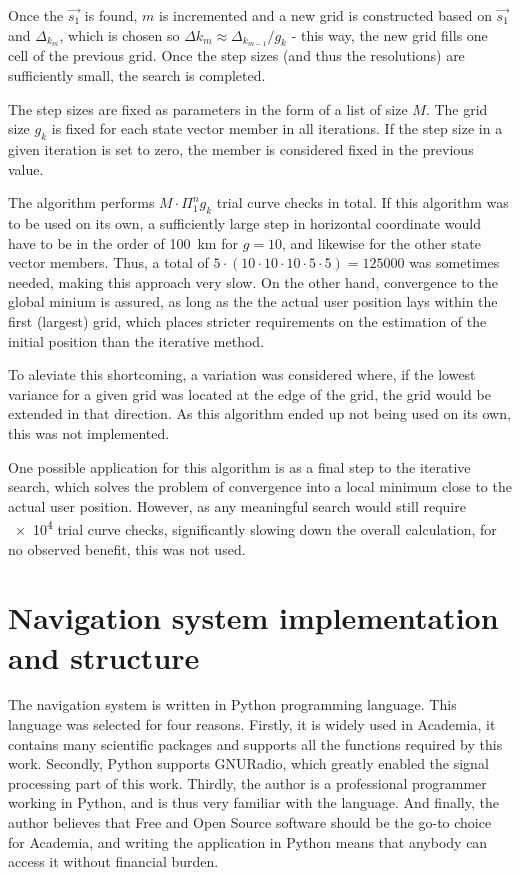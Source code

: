 Once the $\Vec{s_1}$ is found, $m$ is incremented and a new grid is constructed based on $\Vec{s_1}$ and $\Delta_{k_m}$, which is chosen so $\Delta{k_{m}} \approx \Delta_{k_{m-1}} / g_k$ - this way, the new grid fills one cell of the previous grid. Once the step sizes (and thus the resolutions) are sufficiently small, the search is completed.

The step sizes are fixed as parameters in the form of a list of size $M$. The grid size $g_k$ is fixed for each state vector member in all iterations. If the step size in a given iteration is set to zero, the member is considered fixed in the previous value.

The algorithm performs $M \cdot \Pi^n_1 g_k$ trial curve checks in total. If this algorithm was to be used on its own, a sufficiently large step in horizontal coordinate would have to be in the order of \qty{100}{km} for $g = 10$, and likewise for the other state vector members. Thus, a total of $5 \cdot (10 \cdot 10 \cdot 10 \cdot 5 \cdot 5) = \num{125000}$ was sometimes needed, making this approach very slow. On the other hand, convergence to the global minium is assured, as long as the the actual user position lays within the first (largest) grid, which places stricter requirements on the estimation of the initial position than the iterative method.

To aleviate this shortcoming, a variation was considered where, if the lowest variance for a given grid was located at the edge of the grid, the grid would be extended in that direction. As this algorithm ended up not being used on its own, this was not implemented.

One possible application for this algorithm is as a final step to the iterative search, which solves the problem of convergence into a local minimum close to the actual user position. However, as any meaningful search would still require \num{e4} trial curve checks, significantly slowing down the overall calculation, for no observed benefit, this was not used.


\section{Navigation system implementation and structure}
The navigation system is written in Python programming language. This language was selected for four reasons. Firstly, it is widely used in Academia, it contains many scientific packages and supports all the functions required by this work. Secondly, Python supports GNURadio, which greatly enabled the signal processing part of this work. Thirdly, the author is a professional programmer working in Python, and is thus very familiar with the language. And finally, the author believes that Free and Open Source software should be the go-to choice for Academia, and writing the application in Python means that anybody can access it without financial burden.

